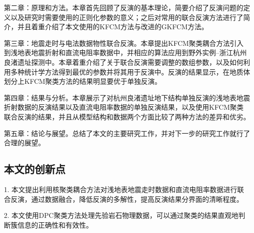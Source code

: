 第二章：原理和方法。本章首先回顾了反演的基本理论，简要介绍了反演问题的定义以及研究时需要使用的正则化参数的意义；之后对常用的联合反演方法进行了简介，并且着重介绍了本文使用的KFCM方法与改进的GKFCM方法。

第三章：地震走时与电法数据物性联合反演。本章提出KFCM聚类耦合方法引入到浅地表地震折射和直流电阻率数据中，并相应的算法应用到野外实例--浙江杭州良渚遗址探测中。本章着重介绍了关于联合反演需要调整的数组参数，以及如何利用多种统计学方法得到最优的参数并将其用于反演中。反演的结果显示，在地质体划分上KFCM聚类方法的结果明显要优于单独反演。

第四章：结果与分析。本章展示了对杭州良渚遗址地下结构单独反演的浅地表地震折射数据的反演结果以及直流电阻率数据的单独反演结果，以及使用KFCM聚类联合反演的结果，并且从模型结构和数据两个方面比较了两种方法的差异和优劣。

第五章：结论与展望。总结了本文的主要研究工作，并对下一步的研究工作就行了合理的展望。

\subsection{本文的创新点}

1. 本文提出利用核聚类耦合方法对浅地表地震走时数据和直流电阻率数据进行联合反演，通过数据融合，降低反演的多解性，提高反演结果分界面的清晰程度。

2. 本文使用DPC聚类方法处理先验岩石物理数据，可以通过聚类的结果直观地判断簇信息的正确性和有效性。